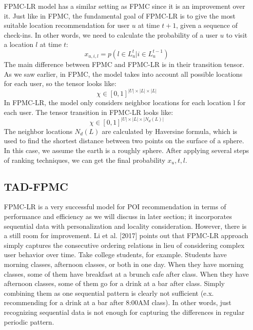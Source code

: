 \documentclass{sig-alternate}
\begin{document}
FPMC-LR model has a similar setting as FPMC since it is an improvement 
over it. Just like in FPMC, the fundamental goal of FPMC-LR is to give the most suitable 
location recommendation for user $u$ at time $t + 1$, given a sequence of check-ins. 
In other words, we need to calculate the probability of a user $u$ to visit a location $l$ at time $t$:
\begin{equation}
	x_{u,i,l}=p(l \in L_u^t | i \in L_u^{t-1})
\label{eq:summation}
\end{equation}
The main difference between FPMC and FPMC-LR is in their transition tensor. As we saw earlier, in FPMC, the model takes into account all possible locations for each user, so the tensor looks like: 
\begin{equation}
	\chi \in [0, 1]^{|U| \times |L| \times |L|}
\label{eq:summation}
\end{equation}
In FPMC-LR, the model only considers neighbor locations for each location l for each user. 
The tensor transition in FPMC-LR looks like:
\begin{equation}
	\chi \in [0, 1]^{|U| \times |L| \times |N_d(L)|}
\label{eq:summation}
\end{equation}
The neighbor locations \begin{math}N_d(L)\end{math} are calculated by Haversine formula, 
which is used to find the shortest distance between two points on the surface of a sphere. 
In this case, we assume the earth is a roughly sphere. After applying several steps of ranking techniques, 
we can get the final probability \begin{math}x_u,t,l\end{math}.

\subsection{TAD-FPMC}
\label{sec:typeChangesSpecialChars}

FPMC-LR is a very successful model for POI recommendation in terms of performance and efficiency 
as we will discuss in later section; it incorporates sequential data with personalization and locality consideration. 
However, there is a still room for improvement. Li et al. [2017] points out that FPMC-LR approach simply captures 
the consecutive ordering relations in lieu of considering complex user behavior over time. Take college students, 
for example. Students have morning classes, afternoon classes, or both in one day. When they have morning classes, 
some of them have breakfast at a brunch cafe after class. When they have afternoon classes, some of them go 
for a drink at a bar after class. Simply combining them as one sequential pattern is clearly not sufficient (e.x. recommending 
for a drink at a bar after 8:00AM class). In other words, just recognizing sequential data is not 
enough for capturing the differences in regular periodic pattern.
\end{document}
